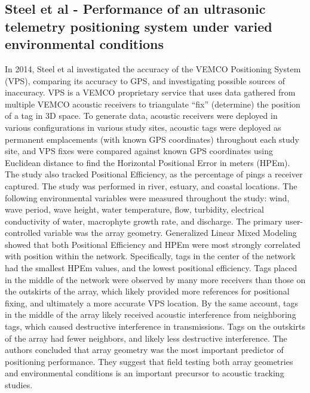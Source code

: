 \subsection {Steel et al - Performance of an ultrasonic telemetry positioning system under varied environmental conditions}
In 2014, Steel et al\cite{Steel2014} investigated the accuracy of the VEMCO Positioning System (VPS), comparing its accuracy to GPS, and investigating possible sources of inaccuracy.  VPS is a VEMCO proprietary service that uses data gathered from multiple VEMCO acoustic receivers to triangulate ``fix'' (determine) the position of a tag in 3D space.  To generate data, acoustic receivers were deployed in various configurations in various study sites, acoustic tags were deployed as permanent emplacements (with known GPS coordinates) throughout each study site, and VPS fixes were compared against known GPS coordinates using Euclidean distance to find the Horizontal Positional Error in meters (HPEm).  The study also tracked Positional Efficiency, as the percentage of pings a receiver captured.  The study was performed in river, estuary, and coastal locations.  The following environmental variables were measured throughout the study: wind, wave period, wave height, water temperature, flow, turbidity, electrical conductivity of water, macrophyte growth rate, and discharge.  The primary user-controlled variable was the array geometry.  Generalized Linear Mixed Modeling showed that both Positional Efficiency and HPEm were most strongly correlated with position within the network.  Specifically, tags in the center of the network had the smallest HPEm values, and the lowest positional efficiency.  Tags placed in the middle of the network were observed by many more receivers than those on the outskirts of the array, which likely provided more references for positional fixing, and ultimately a more accurate VPS location.  By the same account, tags in the middle of the array likely received acoustic interference from neighboring tags, which  caused destructive interference in transmissions.  Tags on the outskirts of the array had fewer neighbors, and likely less destructive interference.  The authors concluded that array geometry was the most important predictor of positioning performance. They suggest that field testing both array geometries and environmental conditions is an important precursor to acoustic tracking studies.



